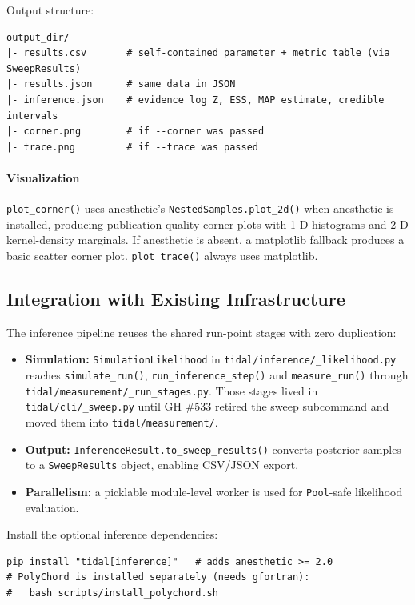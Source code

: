 Output structure:

\begin{lstlisting}
output_dir/
|- results.csv       # self-contained parameter + metric table (via SweepResults)
|- results.json      # same data in JSON
|- inference.json    # evidence log Z, ESS, MAP estimate, credible intervals
|- corner.png        # if --corner was passed
|- trace.png         # if --trace was passed
\end{lstlisting}

\paragraph{Visualization}
\texttt{plot\_corner()} uses anesthetic's \texttt{NestedSamples.plot\_2d()} when
anesthetic is installed, producing publication-quality corner plots with
1-D histograms and 2-D kernel-density marginals.  If anesthetic is absent,
a matplotlib fallback produces a basic scatter corner plot.
\texttt{plot\_trace()} always uses matplotlib.

\subsection{Integration with Existing Infrastructure}
\label{sec:inference-integration}

The inference pipeline reuses the shared run-point stages with zero
duplication:

\begin{itemize}
  \item \textbf{Simulation:} \texttt{SimulationLikelihood} in
    \texttt{tidal/inference/\_likelihood.py} reaches \texttt{simulate\_run()},
    \texttt{run\_inference\_step()} and \texttt{measure\_run()} through
    \texttt{tidal/measurement/\_run\_stages.py}.  Those stages lived in
    \texttt{tidal/cli/\_sweep.py} until GH \#533 retired the sweep subcommand
    and moved them into \texttt{tidal/measurement/}.
  \item \textbf{Output:} \texttt{InferenceResult.to\_sweep\_results()} converts
    posterior samples to a \texttt{SweepResults} object, enabling CSV/JSON
    export.
  \item \textbf{Parallelism:} a picklable module-level worker is used for
    \texttt{Pool}-safe likelihood evaluation.
\end{itemize}

Install the optional inference dependencies:

\begin{lstlisting}[style=bash]
pip install "tidal[inference]"   # adds anesthetic >= 2.0
# PolyChord is installed separately (needs gfortran):
#   bash scripts/install_polychord.sh
\end{lstlisting}

